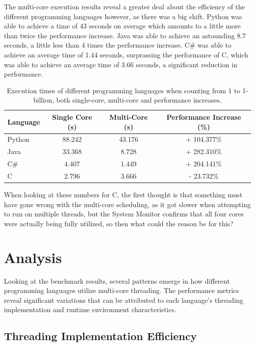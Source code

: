 \documentclass[12pt,a4paper]{article}
\begin{document}
The multi-core execution results reveal a greater deal about the efficiency of the different programming languages however, as there was a big shift. Python was able to achieve a time of 43 seconds on average which amounts to a little more than twice the performance increase. Java was able to achieve an astounding 8.7 seconds, a little less than 4 times the performance increase. C\# was able to achieve an average time of 1.44 seconds, surprassing the performance of C, which was able to achieve an average time of 3.66 seconds, a significant reduction in performance.

\begin{table}[H]
    \centering
    \begin{tabular}{|l|c|c|c|}
        \hline
        Language & Single Core (s) & Multi-Core (s) & Performance Increase (\%) \\
        \hline
        Python & 88.242 & 43.176 & + 104.377\% \\
        Java & 33.368 & 8.728 & + 282.310\% \\
        C\# & 4.407 & 1.449 & + 204.141\% \\
        C & 2.796 & 3.666 & - 23.732\% \\
        \hline
    \end{tabular}
    \captionsetup{font=small, justification=centering}
    \caption{Execution times of different programming languages when counting from 1 to 1-billion, both single-core, multi-core and performance increases.}
    \label{tab:exec-times}
\end{table}

When looking at these numbers for C, the first thought is that something must have gone wrong with the multi-core scheduling, as it got slower when attempting to run on multiple threads, but the System Monitor confirms that all four cores were actually being fully utilized, so then what could the reason be for this?

\section{Analysis}

Looking at the benchmark results, several patterns emerge in how different programming languages utilize multi-core threading. The performance metrics reveal significant variations that can be attributed to each language's threading implementation and runtime environment characteristics.

\subsection{Threading Implementation Efficiency}
\end{document}
